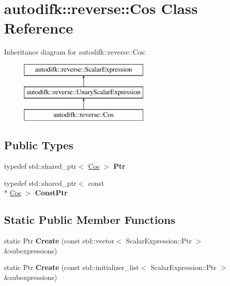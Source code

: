 \hypertarget{classautodifk_1_1reverse_1_1_cos}{\section{autodifk\-:\-:reverse\-:\-:Cos Class Reference}
\label{classautodifk_1_1reverse_1_1_cos}
}
Inheritance diagram for autodifk\-:\-:reverse\-:\-:Cos\-:\begin{figure}[H]
\begin{center}
\leavevmode
\includegraphics[height=3.000000cm]{classautodifk_1_1reverse_1_1_cos}
\end{center}
\end{figure}
\subsection*{Public Types}
\begin{DoxyCompactItemize}
\item 
\hypertarget{classautodifk_1_1reverse_1_1_cos_a51a1b4db9026e1f4b6587cf903d58a55}{typedef std\-::shared\-\_\-ptr$<$ \hyperlink{classautodifk_1_1reverse_1_1_cos}{Cos} $>$ {\bfseries Ptr}}\label{classautodifk_1_1reverse_1_1_cos_a51a1b4db9026e1f4b6587cf903d58a55}

\item 
\hypertarget{classautodifk_1_1reverse_1_1_cos_aba4bb9a43267a07f3abd8d4e83968d5e}{typedef std\-::shared\-\_\-ptr$<$ const \\*
\hyperlink{classautodifk_1_1reverse_1_1_cos}{Cos} $>$ {\bfseries Const\-Ptr}}\label{classautodifk_1_1reverse_1_1_cos_aba4bb9a43267a07f3abd8d4e83968d5e}

\end{DoxyCompactItemize}
\subsection*{Static Public Member Functions}
\begin{DoxyCompactItemize}
\item 
\hypertarget{classautodifk_1_1reverse_1_1_cos_a7a6faa6d27028983a4f6242ac85a51b3}{static Ptr {\bfseries Create} (const std\-::vector$<$ Scalar\-Expression\-::\-Ptr $>$ \&subexpressions)}\label{classautodifk_1_1reverse_1_1_cos_a7a6faa6d27028983a4f6242ac85a51b3}

\item 
\hypertarget{classautodifk_1_1reverse_1_1_cos_af3e6e1d3a3e15f68c71ad7c02c862a32}{static Ptr {\bfseries Create} (const std\-::initializer\-\_\-list$<$ Scalar\-Expression\-::\-Ptr $>$ \&subexpressions)}\label{classautodifk_1_1reverse_1_1_cos_af3e6e1d3a3e15f68c71ad7c02c862a32}

\end{DoxyCompactItemize}
